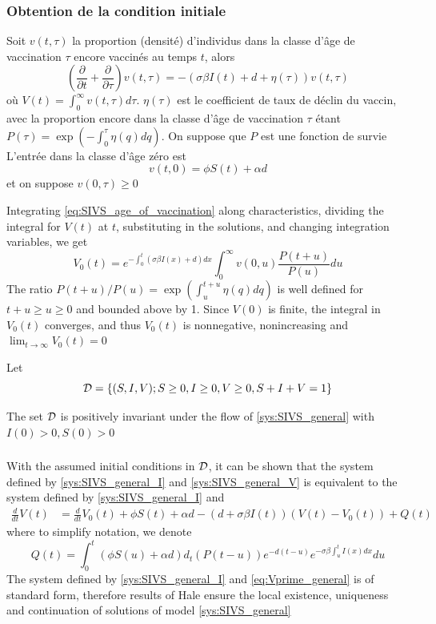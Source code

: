 \documentclass[aspectratio=169]{beamer}\usepackage[]{graphicx}\usepackage[]{xcolor}
\begin{document}
\begin{frame}\frametitle{Obtention de la condition initiale}
Soit $v(t,\tau)$ la proportion (densité) d'individus dans la classe d'âge de vaccination $\tau$ encore vaccinés au temps $t$,
alors
\begin{equation}\label{eq:SIVS_age_of_vaccination}
\left(\frac{\partial}{\partial t}+\frac{\partial}{\partial\tau}\right)
v(t,\tau)=
-(\sigma\beta I(t)+d+\eta(\tau))v(t,\tau)
\end{equation}
où $V(t)=\int_0^\infty v(t,\tau)d\tau$. $\eta(\tau)$ est le coefficient de taux de déclin du vaccin, avec la proportion encore dans la classe d'âge de vaccination $\tau$ étant $P(\tau)=\exp\left(-\int_0^\tau\eta(q)dq\right)$.
On suppose que $P$ est une fonction de survie
\vfill
L'entrée dans la classe d'âge zéro est 
\[
v(t,0)=\phi S(t)+\alpha d
\]
et on suppose $v(0,\tau)\geq 0$
\end{frame}

\begin{frame}
Integrating \eqref{eq:SIVS_age_of_vaccination} along characteristics, dividing the integral for $V(t)$ at $t$, substituting in the solutions, and changing integration variables, we get
\begin{equation}
V_0(t)=e^{-\int_0^t(\sigma\beta I(x)+d)dx} \int_0^\infty
v(0,u)\frac{P(t+u)}{P(u)}du 
\label{eq:V0}
\end{equation}
The ratio $P(t+u)/P(u)=\exp\left(\int_u^{t+u}\eta(q)dq\right)$ is well defined for $t+u\geq u\geq 0$ and bounded above by 1. 
\vfill
Since $V(0)$ is finite, the integral in $V_0(t)$ converges, and thus $V_0(t)$ is nonnegative,
nonincreasing and $\lim_{t\to\infty}V_0(t)=0$
\end{frame}

\begin{frame}
Let
\[
\mathcal{D}=\{
(S,I,V); S\geq 0, I\geq 0, V\geq 0, S+I+V=1
\}
\]
\vfill
\begin{theorem}
The set $\mathcal{D}$ is positively invariant under the flow of \eqref{sys:SIVS_general} with $I(0)>0, S(0)>0$
\label{th:invariance_gen_model}
\end{theorem}
\end{frame}


\begin{frame}\frametitle{}
With the assumed initial conditions in $\mathcal{D}$, it can be shown that the system defined by \eqref{sys:SIVS_general_I} and \eqref{sys:SIVS_general_V} is equivalent to the system defined by \eqref{sys:SIVS_general_I} and
\begin{align}
\label{eq:Vprime_general}
\frac{d}{dt}V(t) &= \frac{d}{dt}V_0(t)+\phi S(t)+\alpha d -(d+\sigma\beta I(t))(V(t)-V_0(t)) 
+ Q(t)
\end{align}
where to simplify notation, we denote
\[
Q(t)=\int_0^t (\phi S(u)+\alpha d) d_t(P(t-u))e^{-d(t-u)}
e^{-\sigma\beta\int_u^t I(x)dx}du
\]
\vfill
The system defined by \eqref{sys:SIVS_general_I} and \eqref{eq:Vprime_general} is of standard form, therefore results of Hale \cite{hale2013introduction} ensure the local existence, uniqueness and continuation of solutions of model \eqref{sys:SIVS_general}
\end{frame}
\end{document}
